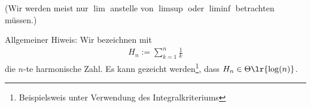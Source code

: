\begin{questions}
	(Wir werden meist nur $\lim$ anstelle von $\limsup$ oder $\liminf$ betrachten müssen.)

    \vspace{1cm}
    \noindent
Allgemeiner Hiweis: Wir bezeichnen mit
\begin{align}
H_n := \sum_{k=1}^{n} \frac{1}{k}\end{align}
die $n$-te harmonische Zahl. Es kann gezeicht werden\footnote{Beispielsweis unter Verwendung des Integralkriteriums}, dass $H_n \in \Theta\lr{\log(n)}$.
\end{questions}
